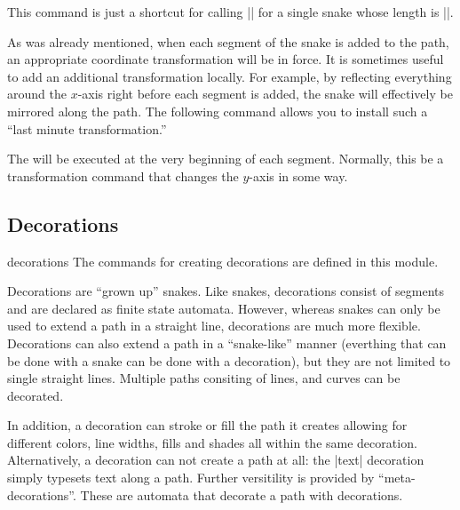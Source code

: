 \begin{command}{\pgfpathsnaketo{}}
  This command is just a shortcut for calling |\pgfpathsnakesto| for a
  single snake whose length is |\pgfsnakeremainingdistance|.
\begin{codeexample}[]
\end{codeexample}
\end{command}

As was already mentioned, when each segment of the snake is added to
the path, an appropriate coordinate transformation will be in
force. It is sometimes useful to add an additional transformation
locally. For example, by reflecting everything around the $x$-axis
right before each segment is added, the snake will effectively be
mirrored along the path. The following command allows you to install
such a ``last minute transformation.''

\begin{command}{\pgfsetsnakesegmenttransformation{}}
  The  will be executed at the very beginning of each
  segment. Normally, this be a transformation command that changes the
  $y$-axis in some way.
\end{command}


\subsection{Decorations}
\label{section-base-decorations}

\begin{pgfmodule}{decorations}
  The commands for creating decorations are defined in this module.
\end{pgfmodule}

Decorations are ``grown up'' snakes. Like snakes,
decorations consist of segments and are declared as finite 
state automata. However, whereas snakes can
only be used to extend a path in a straight line, decorations
are much more flexible. Decorations can also extend a path in a
``snake-like'' manner (everthing that can be done with a snake
can be done with a decoration), but they are not limited to
single straight lines. Multiple paths consiting of lines, and 
curves can be decorated. 

In addition, a decoration can stroke or fill the path it creates 
allowing for different colors, line widths, fills and shades all 
within the same decoration. Alternatively, a decoration can not 
create a path at all: the |text| decoration simply typesets text
along a path.
Further versitility is provided by ``meta-decorations''. These
are automata that decorate a path with decorations.

